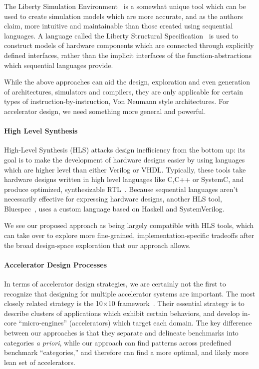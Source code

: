 
The Liberty Simulation Environment~\cite{vachharajani2006liberty} is a somewhat
unique tool which can be used to create simulation models which are more
accurate, and as the authors claim, more intuitive and maintainable than those
created using sequential languages.  A language called the Liberty Structural
Specification~\cite{liberty} is used to construct
models of hardware components which are connected through explicitly defined
interfaces, rather than the implicit interfaces of the function-abstractions
which sequential languages provide. 

While the above approaches can aid the design, exploration and even generation
of architectures, simulators and compilers, they are only applicable for certain
types of instruction-by-instruction, Von Neumann style architectures.  For accelerator
design, we need something more general and powerful.

\paragraph{High Level Synthesis} High-Level Synthesis (HLS) attacks design
inefficiency from the bottom up: its goal is to make the development of
hardware designs easier by using languages which are higher level than either
Verilog or VHDL.  Typically, these tools take hardware designs written in
high level languages like C,C++ or SystemC, and produce optimized,
synthesizable RTL~\cite{5209959}.  Because sequential languages aren't
necessarily effective for expressing hardware designs, another HLS tool,
Bluespec~\cite{bluespec}, uses a custom language based on Haskell and
SystemVerilog.  

We see our proposed approach as being largely compatible with HLS tools,
which can take over to explore more fine-grained, implementation-specific
tradeoffs after the broad design-space exploration that our approach allows.

\paragraph{Accelerator Design Processes} In terms of accelerator design
strategies, we are certainly not the first to recognize that designing for
multiple accelerator systems are important.  The most closely related
strategy is the 10$\times$10 framework~\cite{10by10}.  Their essential
strategy is to describe clusters of applications which exhibit certain
behaviors, and develop in-core ``micro-engines'' (accelerators) which target
each domain.  The key difference between our approaches is that they separate
and delineate benchmarks into categories \emph{a priori}, while our approach
can find patterns across predefined benchmark ``categories,'' and therefore
can find a more optimal, and likely more lean set of accelerators.

